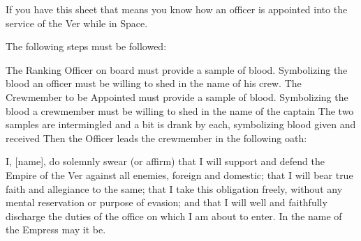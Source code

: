 \documentclass[green]{guildcamp4}
\begin{document}
\name{\gAppoint{}}

If you have this sheet that means you know how an officer is appointed into the service of the Ver while in Space. 

The following steps must be followed:

The Ranking Officer on board must provide a sample of blood. Symbolizing the blood an officer must be willing to shed in the name of his crew.
The Crewmember to be Appointed must provide a sample of blood. Symbolizing the blood a crewmember must be willing to shed in the name of the captain
The two samples are intermingled and a bit is drank by each, symbolizing blood given and received
Then the Officer leads the crewmember in the following oath:

I, [name], do solemnly swear (or affirm) that I will support and defend the Empire of the Ver against all enemies, foreign and domestic; that I will bear true faith and allegiance to the same; that I take this obligation freely, without any mental reservation or purpose of evasion; and that I will well and faithfully discharge the duties of the office on which I am about to enter. In the name of the Empress may it be.
\end{document}
